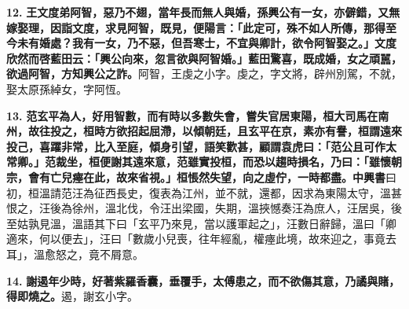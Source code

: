 \textbf{12.} \textbf{王文度弟阿智，惡乃不翅，當年長而無人與婚，孫興公有一女，亦僻錯，又無嫁娶理，因詣文度，求見阿智，既見，便陽言：「此定可，殊不如人所傳，那得至今未有婚處？我有一女，乃不惡，但吾寒士，不宜與卿計，欲令阿智娶之。」文度欣然而啓藍田云：「興公向來，忽言欲與阿智婚。」藍田驚喜，既成婚，女之頑嚚，欲過阿智，方知興公之詐。}{\footnotesize 阿智，王虔之小字。虔之，字文將，辟州別駕，不就，娶太原孫綽女，字阿恆。}

\textbf{13.} \textbf{范玄平為人，好用智數，而有時以多數失會，嘗失官居東陽，桓大司馬在南州，故往投之，桓時方欲招起屈滯，以傾朝廷，且玄平在京，素亦有譽，桓謂遠來投己，喜躍非常，比入至庭，傾身引望，語笑歡甚，顧謂袁虎曰：「范公且可作太常卿。」范裁坐，桓便謝其遠來意，范雖實投桓，而恐以趨時損名，乃曰：「雖懷朝宗，會有亡兒瘞在此，故來省視。」桓悵然失望，向之虛佇，一時都盡。}{\footnotesize \textbf{中興書}曰初，桓溫請范汪為征西長史，復表為江州，並不就，還都，因求為東陽太守，溫甚恨之，汪後為徐州，溫北伐，令汪出梁國，失期，溫挾憾奏汪為庶人，汪居吳，後至姑孰見溫，溫語其下曰「玄平乃來見，當以護軍起之」，汪數日辭歸，溫曰「卿適來，何以便去」，汪曰「數歲小兒喪，往年經亂，權瘞此境，故來迎之，事竟去耳」，溫愈怒之，竟不屑意。}

\textbf{14.} \textbf{謝遏年少時，好著紫羅香囊，垂覆手，太傅患之，而不欲傷其意，乃譎與賭，得即燒之。}{\footnotesize 遏，謝玄小字。}